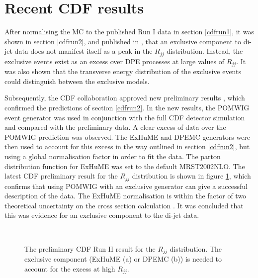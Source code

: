 \section{Recent CDF results}

After normalising the MC to the published Run I data in section \ref{cdfrun1}, it was shown in section \ref{cdfrun2}, and published in \cite{Cox:2005gr}, that an exclusive component to di-jet data does not manifest itself as a peak in the $R_{jj}$ distribution. Instead, the exclusive events exist as an excess over DPE processes at large values of $R_{jj}$. It was also shown that the transverse energy distribution of the exclusive events could distinguish between the exclusive models. 

Subsequently, the CDF collaboration approved new preliminary results \cite{Terashi:2006bc, Gallinaro:2006vz}, which confirmed the predictions of section \ref{cdfrun2}. In the new results, the POMWIG event generator was used in conjunction with the full CDF detector simulation and compared with the preliminary data. 
A clear excess of data over the POMWIG prediction was observed. The ExHuME and DPEMC generators were then used to account for this excess in the way outlined in section \ref{cdfrun2}, but using a global normalisation factor in order to fit the data. The parton distribution function for ExHuME was set to the default MRST2002NLO. The latest CDF preliminary result for the $R_{jj}$ distribution is shown in figure \ref{cdfprelimrjj}, which confirms that using POMWIG with an exclusive generator can give a successful description of the data. The ExHuME normalisation is within the factor of two theoretical uncertainty on the cross section calculation \cite{kojiterashi}. It was concluded that this was evidence for an exclusive component to the di-jet data.

\begin{figure}[t]
\centering
	\mbox{
	}
\caption[The preliminary CDF Run II result for the $R_{jj}$ distribution]{ The preliminary \cite{Terashi:2006bc,Gallinaro:2006vz} CDF Run II result for the $R_{jj}$ distribution. The exclusive component (ExHuME (a) or DPEMC (b)) is needed to account for the excess at high $R_{jj}$.\label{cdfprelimrjj}}
\end{figure}


